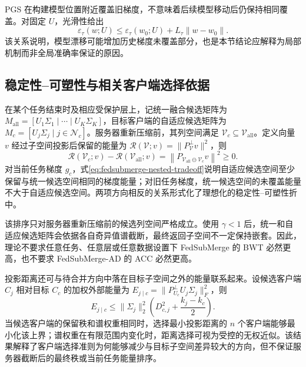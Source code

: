 PGS 在构建模型位置附近覆盖旧梯度，不意味着后续模型移动后仍保持相同覆盖。对固定 $U$，光滑性给出
\begin{equation}
\varepsilon_{\tau}(w;U)
\leq
\varepsilon_{\tau}(w_0;U)
+
L_{\tau}\|w-w_0\|.
\label{eq:fedsubmerge-model-drift}
\end{equation}
该关系说明，模型漂移可能增加历史梯度未覆盖部分，也是本节结论应解释为局部机制而非全局准确率保证的原因。

\subsection{稳定性--可塑性与相关客户端选择依据}
\label{subsec:fedsubmerge-theory-plasticity}

在某个任务结束时及相应受保护层上，记统一融合候选矩阵为
$M_{\mathrm{all}}=[U_1\Sigma_1\mid\cdots\mid U_K\Sigma_K]$，目标客户端的自适应候选矩阵为
$M_c=[U_j\Sigma_j\mid j\in\mathcal{N}_c]$。服务器重新压缩前，其列空间满足
$\mathcal{V}_c\subseteq\mathcal{V}_{\mathrm{all}}$。定义向量 $v$ 经过子空间投影后保留的能量为
$\mathcal{R}(\mathcal{V};v)=\|P_{\mathcal{V}}^{\perp}v\|^2$，则
\begin{equation}
\mathcal{R}(\mathcal{V}_c;v)
-
\mathcal{R}(\mathcal{V}_{\mathrm{all}};v)
=
\left\|P_{\mathcal{V}_{\mathrm{all}}\ominus\mathcal{V}_c}v\right\|^2
\geq0.
\label{eq:fedsubmerge-nested-tradeoff}
\end{equation}
对当前任务梯度 $g_c$，式\eqref{eq:fedsubmerge-nested-tradeoff}说明自适应候选空间至少保留与统一候选空间相同的梯度能量；对旧任务梯度，统一候选空间的未覆盖能量不大于自适应候选空间。两项方向相反的关系形式化了理想化的稳定性--可塑性折中。

该排序只对服务器重新压缩前的候选列空间严格成立。使用 $\gamma<1$ 后，统一和自适应候选矩阵会依据各自奇异值谱截断，最终返回子空间不一定保持嵌套。因此，理论不要求任意任务、任意层或任意数据设置下 FedSubMerge 的 BWT 必然更高，也不要求 FedSubMerge-AD 的 ACC 必然更高。

投影距离还可与待合并方向中落在目标子空间之外的能量联系起来。设候选客户端 $C_j$ 相对目标 $C_c$ 的加权外部能量为
$E_{j\mid c}=\|P_{U_c}^{\perp}U_j\Sigma_j\|_F^2$，则
\begin{equation}
E_{j\mid c}
\leq
\|\Sigma_j\|_2^2
\left(
D_{c,j}^2+\frac{k_j-k_c}{2}
\right).
\label{eq:fedsubmerge-peer-energy-bound}
\end{equation}
当候选客户端的保留秩和谱权重相同时，选择最小投影距离的 $n$ 个客户端能够最小化该上界；谱权重在有限范围内变化时，距离选择可视为受控的无权近似。该结果解释了客户端选择准则为何能够减少与目标子空间差异较大的方向，但不保证服务器截断后的最终秩或当前任务能量排序。

